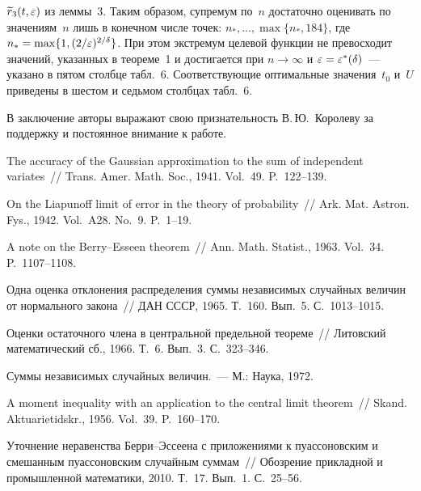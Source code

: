 \begin{multicols}{2}
\addtocounter{table}{1}

\vspace*{12pt}


\noindent
$\widetilde r_3(t,\varepsilon)$ из
леммы~3. Таким  образом, супремум по~$n$ достаточно оценивать
по значениям~$n$ лишь в конечном числе точек:
$n_*,\ldots,\max\{n_*,184\}$, где
 $n_*=\max\{1,(2/\varepsilon)^{2/\delta}\}$.
При этом экстремум целевой функции не превосходит значений,
указанных  в теореме~1 и достигается при $n\to\infty$
и $\varepsilon=\varepsilon^*(\delta)$~--- указано в пятом столбце
табл.~6. Соответствующие
оптимальные значения~$t_0$ и~$U$ приведены в шестом и седьмом
столбцах табл.~6.



\bigskip

В заключение авторы выражают свою признательность В.\,Ю.~Королеву
за поддержку и постоянное внимание к работе.

{\small\frenchspacing
{%
\begin{thebibliography}{99}

 The accuracy of the Gaussian approximation to the
sum of independent variates~// Trans. Amer. Math. Soc., 1941.
Vol.~49. P.~122--139.

 On the Liapunoff limit of error in the theory of
probability~// Ark. Mat. Astron. Fys., 1942. Vol.~A28. No.~9.
P.~1--19.

 A note on the Berry--Esseen theorem~// Ann. Math.
Statist., 1963. Vol.~34. P.~1107--1108.

 Одна оценка отклонения распределения суммы
независимых случайных величин от нормального закона~// ДАН СССР,
1965. Т.~160. Вып.~5. С.~1013--1015.

 Оценки остаточного члена в центральной предельной
теореме~// Литовский математический сб., 1966. Т.~6. Вып.~3.
С.~323--346.

 Суммы независимых случайных величин.~--- М.: Наука, 1972.

 A moment inequality with an application to the
central limit theorem~// Skand. Aktuarietidskr., 1956. Vol.~39.
P.~160--170.

 Уточнение неравенства
Берри--Эссеена с приложениями к пуассоновским и смешанным
пуассоновским случайным суммам~// Обозрение прикладной и
промышленной математики, 2010. Т.~17. Вып.~1. С.~25--56.


\end{thebibliography}}}
\end{multicols}
